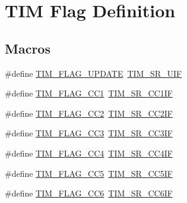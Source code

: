 \hypertarget{group___t_i_m___flag__definition}{}\section{T\+IM Flag Definition}
\label{group___t_i_m___flag__definition}
\subsection*{Macros}
\begin{DoxyCompactItemize}
\item 
\#define \mbox{\hyperlink{group___t_i_m___flag__definition_gac45ce66cf33b4f324323fc3036917712}{T\+I\+M\+\_\+\+F\+L\+A\+G\+\_\+\+U\+P\+D\+A\+TE}}~\mbox{\hyperlink{group___peripheral___registers___bits___definition_gac8c03fabc10654d2a3f76ea40fcdbde6}{T\+I\+M\+\_\+\+S\+R\+\_\+\+U\+IF}}
\item 
\#define \mbox{\hyperlink{group___t_i_m___flag__definition_gaa7eb8be054b9bd217a9abb1c8687cc55}{T\+I\+M\+\_\+\+F\+L\+A\+G\+\_\+\+C\+C1}}~\mbox{\hyperlink{group___peripheral___registers___bits___definition_ga449a61344a97608d85384c29f003c0e9}{T\+I\+M\+\_\+\+S\+R\+\_\+\+C\+C1\+IF}}
\item 
\#define \mbox{\hyperlink{group___t_i_m___flag__definition_ga9cae242f1c51b31839ffc5bc007c82a7}{T\+I\+M\+\_\+\+F\+L\+A\+G\+\_\+\+C\+C2}}~\mbox{\hyperlink{group___peripheral___registers___bits___definition_ga25a48bf099467169aa50464fbf462bd8}{T\+I\+M\+\_\+\+S\+R\+\_\+\+C\+C2\+IF}}
\item 
\#define \mbox{\hyperlink{group___t_i_m___flag__definition_ga052c380f922219659810e4fceb574a7c}{T\+I\+M\+\_\+\+F\+L\+A\+G\+\_\+\+C\+C3}}~\mbox{\hyperlink{group___peripheral___registers___bits___definition_gad3cf234a1059c0a04799e88382cdc0f2}{T\+I\+M\+\_\+\+S\+R\+\_\+\+C\+C3\+IF}}
\item 
\#define \mbox{\hyperlink{group___t_i_m___flag__definition_gafd0dc57b56941f8b8250d66e289542db}{T\+I\+M\+\_\+\+F\+L\+A\+G\+\_\+\+C\+C4}}~\mbox{\hyperlink{group___peripheral___registers___bits___definition_gacade8a06303bf216bfb03140c7e16cac}{T\+I\+M\+\_\+\+S\+R\+\_\+\+C\+C4\+IF}}
\item 
\#define \mbox{\hyperlink{group___t_i_m___flag__definition_gab00cd0136baf5fc6a113a7395982ed81}{T\+I\+M\+\_\+\+F\+L\+A\+G\+\_\+\+C\+C5}}~\mbox{\hyperlink{group___peripheral___registers___bits___definition_ga2167773377ba03c863cc49342c67789f}{T\+I\+M\+\_\+\+S\+R\+\_\+\+C\+C5\+IF}}
\item 
\#define \mbox{\hyperlink{group___t_i_m___flag__definition_ga6ec646997baea79b25d49e2b793c03d0}{T\+I\+M\+\_\+\+F\+L\+A\+G\+\_\+\+C\+C6}}~\mbox{\hyperlink{group___peripheral___registers___bits___definition_gad16e2f81b0c4fe28e323f3302c2240db}{T\+I\+M\+\_\+\+S\+R\+\_\+\+C\+C6\+IF}}

\end{DoxyCompactItemize}
